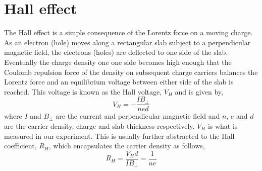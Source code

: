 
\section{Hall effect}

The Hall effect is a simple consequence of the Lorentz force on a moving charge. As an electron (hole) moves along a rectangular slab subject to a perpendicular magnetic field, the electrons (holes) are deflected to one side of the slab. Eventually the charge density one one side becomes high enough that the Coulomb repulsion force of the density on subsequent charge carriers balances the Lorentz force and an equilibrium voltage between either side of the slab is reached. This voltage is known as the Hall voltage, $V_H$ and is given by,
\begin{equation}
    V_H = -\frac{IB_{\perp}}{ned}
\end{equation}
where $I$ and $B_{\perp}$ are the current and perpendicular magnetic field and $n$, $e$ and $d$ are the carrier density, charge and slab thickness respectively. $V_H$ is what is measured in our experiment. This is usually further abstracted to the Hall coefficient, $R_H$, which encapsulates the carrier density as follows,
\begin{equation}
    R_H = \frac{V_H d}{IB_\perp} = \frac{1}{ne}
\end{equation}

